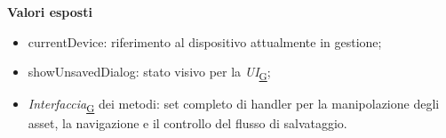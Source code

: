 \documentclass[a4paper,12pt]{article}
\begin{document}
                \textbf{Valori esposti}
                \begin{itemize}
                    \item {\ttfamily currentDevice}: riferimento al dispositivo attualmente in gestione;
                    \item {\ttfamily showUnsavedDialog}: stato visivo per la \textit{UI}\textsubscript{\href{https://atlasteam9.github.io/Atlas/glossario.html\#UI}{G}};
                    \item \textit{Interfaccia}\textsubscript{\href{https://atlasteam9.github.io/Atlas/glossario.html\#Interfaccia}{G}} dei metodi: set completo di handler per la manipolazione degli asset, la navigazione e il controllo del flusso di salvataggio.
                \end{itemize}
                
\end{document}
